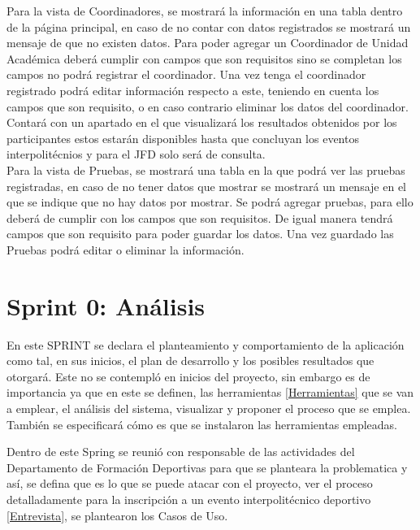 	\noindent Para la vista de Coordinadores, se mostrará la información en una tabla dentro de la página principal, en caso de no contar con datos registrados se mostrará un mensaje de que no existen datos. Para poder agregar un Coordinador de Unidad Académica deberá cumplir con campos que son requisitos sino se completan los campos no podrá registrar el coordinador. Una vez tenga el coordinador registrado podrá editar información respecto a este, teniendo en cuenta los campos que son requisito, o en caso contrario eliminar los datos del coordinador. \\
	
	\noindent Contará con un apartado en el que visualizará los resultados obtenidos por los participantes estos estarán disponibles hasta que concluyan los eventos interpolitécnios y para el JFD solo será de consulta. \\
	
	\noindent Para la vista de Pruebas, se mostrará una tabla en la que podrá ver las pruebas registradas, en caso de no tener datos que mostrar se mostrará un mensaje en el que se indique que no hay datos por mostrar. Se podrá agregar pruebas, para ello deberá de cumplir con los campos que son requisitos. De igual manera tendrá campos que son requisito para poder guardar los datos. Una vez guardado las Pruebas podrá editar o eliminar la información. \\
	\pagebreak
	
	
	\section{Sprint 0: Análisis}
	\noindent En este SPRINT se declara el planteamiento y comportamiento de la aplicación como tal, en sus inicios, el plan de desarrollo y los posibles resultados que otorgará.
	Este no se contempló en inicios del proyecto, sin embargo es de importancia ya que en este se definen, las herramientas \ref{Herramientas} que se van a emplear, el análisis del sistema, visualizar y proponer el proceso que se emplea.
	También se especificará cómo es que se instalaron las herramientas empleadas.
	
	\noindent Dentro de este Spring se reunió con responsable de las actividades del Departamento de Formación Deportivas para que se planteara la problematica y así, se defina que es lo que se puede atacar con el proyecto, ver el proceso detalladamente para la inscripción a un evento interpolitécnico deportivo \ref{Entrevista}, se plantearon los Casos de Uso. 
	
